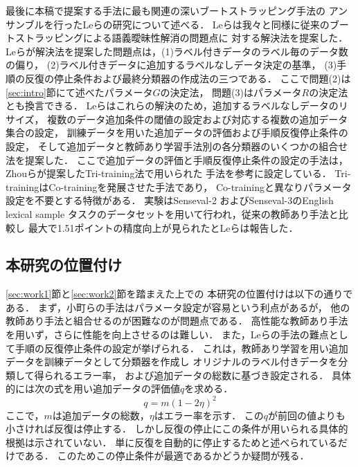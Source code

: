 \documentclass[japanese]{jnlp_1.4}
\begin{document}
最後に本稿で提案する手法に最も関連の深いブートストラッピング手法の
アンサンブルを行ったLeらの研究\cite{Le08}について述べる．
Leらは我々と同様に従来のブートストラッピングによる語義曖昧性解消の問題点に
対する解決法を提案した．
Leらが解決法を提案した問題点は，(1)ラベル付きデータのラベル毎のデータ数の偏り，
(2)ラベル付きデータに追加するラベルなしデータ決定の基準，
(3)手順の反復の停止条件および最終分類器の作成法の三つである．
ここで問題(2)は\ref{sec:intro}節にて述べたパラメータ$G$の決定法，
問題(3)はパラメータ$R$の決定法とも換言できる．
Leらはこれらの解決のため，追加するラベルなしデータのリサイズ，
複数のデータ追加条件の閾値の設定および対応する複数の追加データ集合の設定，
訓練データを用いた追加データの評価および手順反復停止条件の設定，
そして追加データと教師あり学習手法別の各分類器のいくつかの組合せ法を提案した．
ここで追加データの評価と手順反復停止条件の設定の手法は，
Zhouらが提案したTri-training法\cite{Zhou05}で用いられた
手法を参考に設定している．
Tri-trainingはCo-trainingを発展させた手法であり，
Co-trainingと異なりパラメータ設定を不要とする特徴がある．
実験はSenseval-2 \cite{Edmonds01}およびSenseval-3のEnglish lexical sample
タスクのデータセットを用いて行われ，従来の教師あり手法と比較し
最大で1.51ポイントの精度向上が見られたとLeらは報告した．



\subsection{本研究の位置付け}

\ref{sec:work1}節と\ref{sec:work2}節を踏まえた上での
本研究の位置付けは以下の通りである．
まず，小町らの手法はパラメータ設定が容易という利点があるが，
他の教師あり手法と組合せるのが困難なのが問題点である．
高性能な教師あり手法を用いず，さらに性能を向上させるのは難しい．
また，Leらの手法の難点として手順の反復停止条件の設定が挙げられる．
これは，教師あり学習を用い追加データを訓練データとして分類器を作成し
オリジナルのラベル付きデータを分類して得られるエラー率，
および追加データの総数に基づき設定される．
具体的には次の式を用い追加データの評価値$q$を求める．
\begin{equation}
q=m(1-2\eta)^2
\label{eq0}
\end{equation}
ここで，$m$は追加データの総数，$\eta$はエラー率を示す．
この$q$が前回の値よりも小さければ反復は停止する．
しかし反復の停止にこの条件が用いられる具体的根拠は示されていない．
単に反復を自動的に停止するためと述べられているだけである．
このためこの停止条件が最適であるかどうか疑問が残る．
\end{document}

